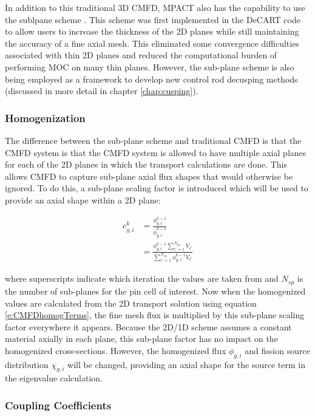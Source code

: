 In addition to this traditional 3D CMFD, MPACT also has the capability to use the sublpane scheme \cite{DeCARTsubplane,ICAPPcontrolRodDecuspingNTRACER}.  This scheme was first implemented in the DeCART code to allow users to increase the thickness of the 2D planes while still maintaining the accuracy of a fine axial mesh.  This eliminated some convergence difficulties associated with thin 2D planes  and reduced the computational burden of performing MOC on many thin planes.  However, the sub-plane scheme is also being employed as a framework to develop new control rod decusping methods (discussed in more detail in chapter \ref{chap:cusping}).


\subsubsection{Homogenization}

The difference between the sub-plane scheme and traditional CMFD is that the CMFD system is that the CMFD system is allowed to have multiple axial planes for each of the 2D planes in which the transport calculations are done.  This allows CMFD to capture sub-plane axial flux shapes that would otherwise be ignored.  To do this, a sub-plane scaling factor is introduced which will be used to provide an axial shape within a 2D plane:

\begin{align}
c_{g,i}^k &= \frac{\phi_{g,i}^{k-1}}{\overline{\phi}_{g,i}^{k-1}} \nonumber\\
 &= \frac{\phi_{g,i}^{k-1} \sum_{i'=1}^{N_{sp}} V_{i'}}{\sum_{i'=1}^{N_{sp}} \phi_{g,i'}^{k-1} V_{i'}}
\end{align}

where superscripts indicate which iteration the values are taken from and $N_{sp}$ is the number of sub-planes for the pin cell of interest.  Now when the homogenized values are calculated from the 2D transport solution using equation \ref{e:CMFDhomogTerms}, the fine mesh flux is multiplied by this sub-plane scaling factor everywhere it appears.  Because the 2D/1D scheme assumes a constant material axially in each plane, this sub-plane factor has no impact on the homogenized cross-sections.  However, the homogenized flux $\phi_{g,i}$ and fission source distribution $\chi_{g,i}$ will be changed, providing an axial shape for the source term in the eigenvalue calculation.

\subsubsection{Coupling Coefficients}

